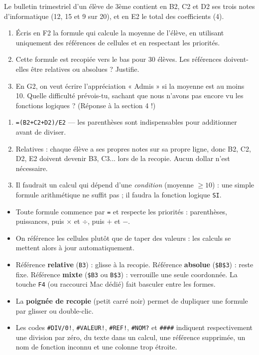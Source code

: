 \documentclass[11pt]{article}
\begin{document}
\begin{exercice}
Le bulletin trimestriel d'un élève de 3ème contient en B2, C2 et D2 ses trois notes d'informatique (12, 15 et 9 sur 20), et en E2 le total des coefficients (4).
\begin{enumerate}
\item Écris en F2 la formule qui calcule la moyenne de l'élève, en utilisant uniquement des références de cellules et en respectant les priorités.
\item Cette formule est recopiée vers le bas pour 30 élèves. Les références doivent-elles être relatives ou absolues ? Justifie.
\item En G2, on veut écrire l'appréciation « Admis » si la moyenne est au moins 10. Quelle difficulté prévois-tu, sachant que nous n'avons pas encore vu les fonctions logiques ? (Réponse à la section 4 !)
\end{enumerate}
\end{exercice}

\begin{corrige}
\begin{enumerate}
\item \texttt{=(B2+C2+D2)/E2} — les parenthèses sont indispensables pour additionner avant de diviser.
\item Relatives : chaque élève a ses propres notes sur sa propre ligne, donc B2, C2, D2, E2 doivent devenir B3, C3... lors de la recopie. Aucun dollar n'est nécessaire.
\item Il faudrait un calcul qui dépend d'une \emph{condition} (moyenne $\geq 10$) : une simple formule arithmétique ne suffit pas ; il faudra la fonction logique \texttt{SI}.
\end{enumerate}
\end{corrige}

\begin{aretenir}
\begin{itemize}
\item Toute formule commence par \texttt{=} et respecte les priorités : parenthèses, puissances, puis $\times$ et $\div$, puis $+$ et $-$.
\item On référence les cellules plutôt que de taper des valeurs : les calculs se mettent alors à jour automatiquement.
\item Référence \textbf{relative} (\texttt{B3}) : glisse à la recopie. Référence \textbf{absolue} (\texttt{\$B\$3}) : reste fixe. Référence \textbf{mixte} (\texttt{\$B3} ou \texttt{B\$3}) : verrouille une seule coordonnée. La touche \texttt{F4} (ou raccourci Mac dédié) fait basculer entre les formes.
\item La \textbf{poignée de recopie} (petit carré noir) permet de dupliquer une formule par glisser ou double-clic.
\item Les codes \texttt{\#DIV/0!}, \texttt{\#VALEUR!}, \texttt{\#REF!}, \texttt{\#NOM?} et \texttt{\#\#\#\#} indiquent respectivement une division par zéro, du texte dans un calcul, une référence supprimée, un nom de fonction inconnu et une colonne trop étroite.
\end{itemize}
\end{aretenir}
\end{document}
